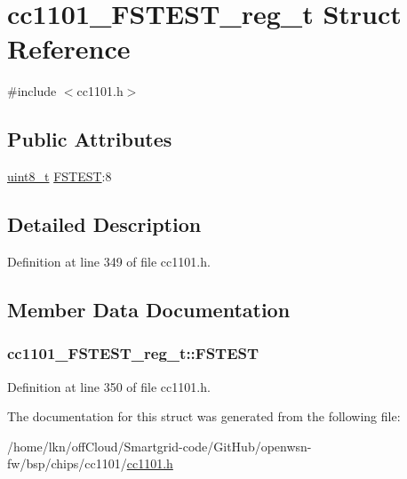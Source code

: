 \hypertarget{structcc1101___f_s_t_e_s_t__reg__t}{}\section{cc1101\+\_\+\+F\+S\+T\+E\+S\+T\+\_\+reg\+\_\+t Struct Reference}
\label{structcc1101___f_s_t_e_s_t__reg__t}


{\ttfamily \#include $<$cc1101.\+h$>$}

\subsection*{Public Attributes}
\begin{DoxyCompactItemize}
\item 
\hyperlink{_p_e___types_8h_aba7bc1797add20fe3efdf37ced1182c5}{uint8\+\_\+t} \hyperlink{structcc1101___f_s_t_e_s_t__reg__t_a001cb9833649f1f9ffbc335f4af12857}{F\+S\+T\+E\+ST}\+:8
\end{DoxyCompactItemize}


\subsection{Detailed Description}


Definition at line 349 of file cc1101.\+h.



\subsection{Member Data Documentation}
\subsubsection[{\texorpdfstring{F\+S\+T\+E\+ST}{FSTEST}}]{ cc1101\+\_\+\+F\+S\+T\+E\+S\+T\+\_\+reg\+\_\+t\+::\+F\+S\+T\+E\+ST}\hypertarget{structcc1101___f_s_t_e_s_t__reg__t_a001cb9833649f1f9ffbc335f4af12857}{}\label{structcc1101___f_s_t_e_s_t__reg__t_a001cb9833649f1f9ffbc335f4af12857}


Definition at line 350 of file cc1101.\+h.



The documentation for this struct was generated from the following file\+:\begin{DoxyCompactItemize}
\item 
/home/lkn/off\+Cloud/\+Smartgrid-\/code/\+Git\+Hub/openwsn-\/fw/bsp/chips/cc1101/\hyperlink{cc1101_8h}{cc1101.\+h}\end{DoxyCompactItemize}
